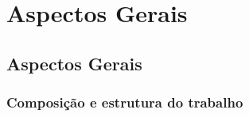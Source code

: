 \part{Aspectos Gerais}

\chapter[Aspectos Gerais]{Aspectos Gerais}


\section{Composição e estrutura do trabalho}

